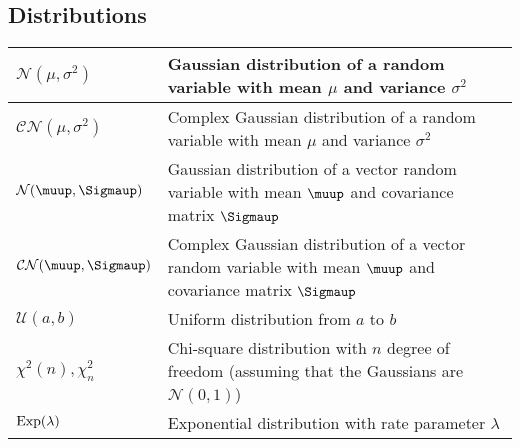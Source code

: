 \subsection{Distributions}
\begin{xltabular}{\textwidth}{XX}
	\(\mathcal{N}(\mu, \sigma^2)\) \cite{papoulisProbabilityRandomVariables2001} & Gaussian distribution of a random variable with mean \(\mu\) and variance \(\sigma^{2}\)                                                                                                                            \\ \hline
	\(\mathcal{CN}(\mu, \sigma^2)\)                                              & Complex Gaussian distribution of a random variable with mean \(\mu\) and variance \(\sigma^{2}\)                                                                                                                    \\ \hline
	\(\mathcal{N}(\boldsymbol{\muup}, \boldsymbol{\Sigmaup})\)                   & Gaussian distribution of a vector random variable with mean \(\boldsymbol{\muup}\) and covariance matrix \(\boldsymbol{\Sigmaup}\)                                                                                  \\ \hline
	\(\mathcal{CN}(\boldsymbol{\muup}, \boldsymbol{\Sigmaup})\)                  & Complex Gaussian distribution of a vector random variable with mean \(\boldsymbol{\muup}\) and covariance matrix \(\boldsymbol{\Sigmaup}\)                                                                          \\ \hline
	\(\mathcal{U}(a,b)\)                                                         & Uniform distribution from \(a\) to \(b\)                                                                                                                                                                            \\ \hline
	\(\chi^2 (n), \chi^2_n\)                                                     & Chi-square distribution with \(n\) degree of freedom (assuming that the Gaussians are \(\mathcal{N}(0,1)\))                                                                                                         \\ \hline
	\(\textnormal{Exp}(\lambda)\)                                                & Exponential distribution with rate parameter \(\lambda\)                                                                                                                                                            \\ \hline

\end{xltabular}
